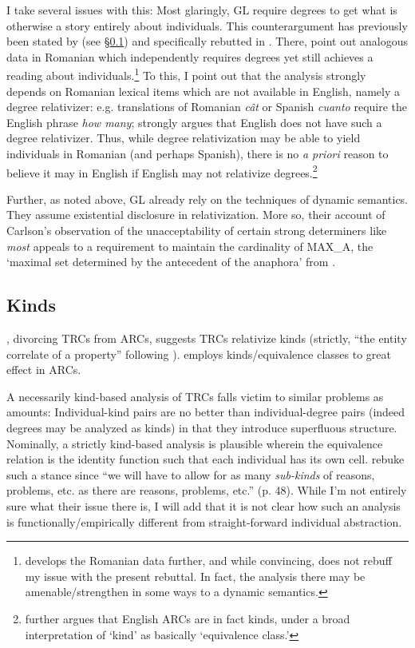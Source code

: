 \documentclass[11pt]{article}
\begin{document}
I take several issues with this: Most glaringly, GL require degrees to get what is otherwise a story entirely about individuals. This counterargument has previously been stated by \citet{mcnallyDPInternalOnlyAmount2008} (see \S\ref{sec:kinds}) and specifically rebutted in \citet{grosuEntitydenotingAmountRelatives2015}. There, \citeauthor{grosuEntitydenotingAmountRelatives2015} point out analogous data in Romanian which independently requires degrees yet still achieves a reading about individuals.\footnote{\citet{grosuSelectedAspectsAmount2015} develops the Romanian data further, and while convincing, does not rebuff my issue with the present rebuttal. In fact, the analysis there may be amenable/strengthen in some ways to a dynamic semantics.} To this, I point out that the analysis strongly depends on Romanian lexical items which are not available in English, namely a degree relativizer: e.g. translations of Romanian \textit{c\^at} or Spanish \textit{cuanto} require the English phrase \textit{how many}; \citet{mendiaAmountRelativesRedux2017} strongly argues that English does not have such a degree relativizer. Thus, while degree relativization may be able to yield individuals in Romanian (and perhaps Spanish), there is no \textit{a priori} reason to believe it may in English if English may not relativize degrees.\footnote{\citet{mendiaAmountRelativesRedux2017} further argues that English ARCs are in fact kinds, under a broad interpretation of `kind' as basically `equivalence class.'}

Further, as noted above, GL already rely on the techniques of dynamic semantics. They assume existential disclosure in relativization. More so, their account of Carlson's observation of the unacceptability of certain strong determiners like \textit{most} appeals to a requirement to maintain the cardinality of MAX_A, the `maximal set determined by the antecedent of the anaphora' from \citet{kadmonUniqueNonuniqueReference1992}.

\subsection{Kinds}\label{sec:kinds}
\citet{mcnallyDPInternalOnlyAmount2008}, divorcing TRCs from ARCs, suggests TRCs relativize kinds (strictly, ``the entity correlate of a property'' following \cite{mcnallyInterpretationEnglishExistential1992}). \citet{mendiaAmountRelativesRedux2017} employs kinds/equivalence classes to great effect in ARCs.

A necessarily kind-based analysis of TRCs falls victim to similar problems as amounts: Individual-kind pairs are no better than individual-degree pairs (indeed degrees may be analyzed as kinds) in that they introduce superfluous structure. Nominally, a strictly kind-based analysis is plausible wherein the equivalence relation is the identity function such that each individual has its own cell. \citet{grosuAmountRelatives2017} rebuke such a stance since ``we will have to allow for as many \textit{sub-kinds} of reasons, problems, etc. as there are reasons, problems, etc.'' (p. 48). While I'm not entirely sure what their issue there is, I will add that it is not clear how such an analysis is functionally/empirically different from straight-forward individual abstraction.
\end{document}
